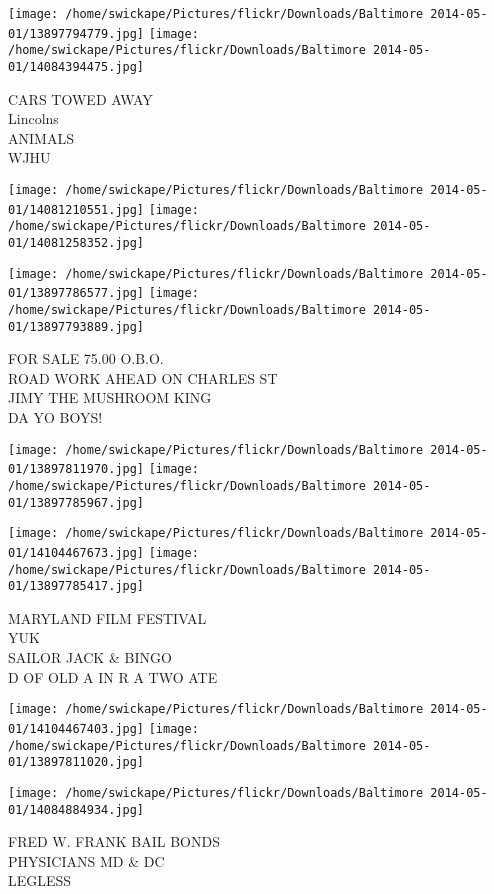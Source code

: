 \documentclass[10pt,letterpaper]{article}
\begin{document}
\texttt{[image: /home/swickape/Pictures/flickr/Downloads/Baltimore 2014-05-01/13897794779.jpg]}
\texttt{[image: /home/swickape/Pictures/flickr/Downloads/Baltimore 2014-05-01/14084394475.jpg]}

CARS TOWED AWAY\\
Lincolns\\
ANIMALS\\
WJHU
\pagebreak

\texttt{[image: /home/swickape/Pictures/flickr/Downloads/Baltimore 2014-05-01/14081210551.jpg]}
\texttt{[image: /home/swickape/Pictures/flickr/Downloads/Baltimore 2014-05-01/14081258352.jpg]}

\texttt{[image: /home/swickape/Pictures/flickr/Downloads/Baltimore 2014-05-01/13897786577.jpg]}
\texttt{[image: /home/swickape/Pictures/flickr/Downloads/Baltimore 2014-05-01/13897793889.jpg]}

FOR SALE 75.00 O.B.O.\\
ROAD WORK AHEAD ON CHARLES ST\\
JIMY THE MUSHROOM KING\\
DA YO BOYS!
\pagebreak

\texttt{[image: /home/swickape/Pictures/flickr/Downloads/Baltimore 2014-05-01/13897811970.jpg]}
\texttt{[image: /home/swickape/Pictures/flickr/Downloads/Baltimore 2014-05-01/13897785967.jpg]}

\texttt{[image: /home/swickape/Pictures/flickr/Downloads/Baltimore 2014-05-01/14104467673.jpg]}
\texttt{[image: /home/swickape/Pictures/flickr/Downloads/Baltimore 2014-05-01/13897785417.jpg]}

MARYLAND FILM FESTIVAL\\
YUK\\
SAILOR JACK \& BINGO\\
D OF OLD A IN R A TWO ATE
\pagebreak

\texttt{[image: /home/swickape/Pictures/flickr/Downloads/Baltimore 2014-05-01/14104467403.jpg]}
\texttt{[image: /home/swickape/Pictures/flickr/Downloads/Baltimore 2014-05-01/13897811020.jpg]}

\texttt{[image: /home/swickape/Pictures/flickr/Downloads/Baltimore 2014-05-01/14084884934.jpg]}

FRED W. FRANK BAIL BONDS\\
PHYSICIANS MD \& DC\\
LEGLESS
\pagebreak
\end{document}
